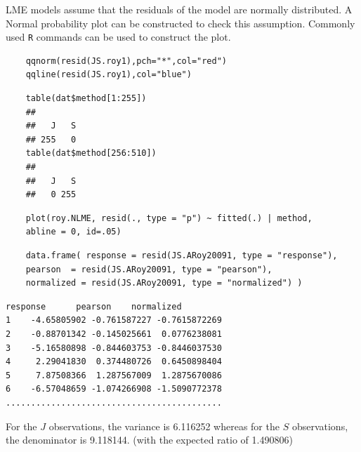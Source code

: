\documentclass[Main.tex]{subfiles}
\begin{document}
LME models assume that the residuals of the model are normally distributed. A Normal probability plot can be constructed to check this assumption. Commonly used \texttt{R} commands can be used to construct the plot.


\begin{framed}
	\begin{verbatim}
	qqnorm(resid(JS.roy1),pch="*",col="red")
	qqline(resid(JS.roy1),col="blue")
	\end{verbatim}
\end{framed}

\begin{framed}
	\begin{verbatim}
	table(dat$method[1:255])
	## 
	##   J   S 
	## 255   0
	table(dat$method[256:510])
	## 
	##   J   S 
	##   0 255
	\end{verbatim}	
\end{framed}

\begin{framed}
	\begin{verbatim}
	plot(roy.NLME, resid(., type = "p") ~ fitted(.) | method, 
	abline = 0, id=.05)
	\end{verbatim}
\end{framed}





\begin{framed}
	\begin{verbatim}
	data.frame( response = resid(JS.ARoy20091, type = "response"), 
	pearson  = resid(JS.ARoy20091, type = "pearson"), 
	normalized = resid(JS.ARoy20091, type = "normalized") )
	\end{verbatim}
\end{framed}

\begin{verbatim}
response      pearson    normalized
1    -4.65805902 -0.761587227 -0.7615872269
2    -0.88701342 -0.145025661  0.0776238081
3    -5.16580898 -0.844603753 -0.8446037530
4     2.29041830  0.374480726  0.6450898404
5     7.87508366  1.287567009  1.2875670086
6    -6.57048659 -1.074266908 -1.5090772378
...........................................
\end{verbatim}
For the $J$ observations, the variance is 6.116252 whereas for the $S$ observations, the denominator is 9.118144. (with the expected ratio of  1.490806)
\end{document}
